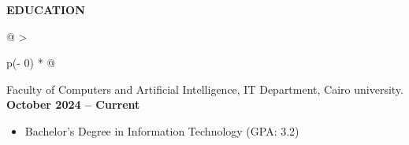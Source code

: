 \documentclass[a4paper]{article}
\begin{document}
\vspace{-8pt}

\textbf{EDUCATION}
\vspace{-8pt}
\begin{longtable}[]{@{}
    >{\raggedright\arraybackslash}p{(\columnwidth - 0\tabcolsep) * }@{}}
\toprule\noalign{}
\vspace{0pt}
\begin{minipage}[t]{\linewidth}\raggedright
Faculty of Computers and Artificial Intelligence, IT Department, Cairo
    university.
\hspace{10em}\textbf{October 2024 -- Current}

    \begin{itemize}
        \item
          Bachelor's Degree in Information Technology (GPA: 3.2)
        \end{itemize}
\end{minipage} \\
\end{longtable}
\end{document}
